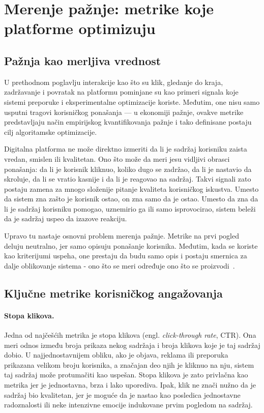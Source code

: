 \section{Merenje pažnje: metrike koje platforme optimizuju}

\subsection{Pažnja kao merljiva vrednost}

U prethodnom poglavlju interakcije kao što su klik, gledanje do kraja, zadržavanje i povratak na platformu pominjane su kao primeri signala koje sistemi preporuke i eksperimentalne optimizacije koriste. Međutim, one nisu samo usputni tragovi korisničkog ponašanja — u ekonomiji pažnje, ovakve metrike predstavljaju način empirijskog kvantifikovanja pažnje i tako definisane postaju cilj algoritamske optimizacije.

Digitalna platforma ne može direktno izmeriti da li je sadržaj korisniku zaista vredan, smislen ili kvalitetan. Ono što može da meri jesu vidljivi obrasci ponašanja: da li je korisnik kliknuo, koliko dugo se zadržao, da li je nastavio da skroluje, da li se vratio kasnije i da li je reagovao na sadržaj. Takvi signali zato postaju zamena za mnogo složenije pitanje kvaliteta korisničkog iskustva. Umesto da sistem zna zašto je korisnik ostao, on zna samo da je ostao. Umesto da zna da li je sadržaj korisniku pomogao, uznemirio ga ili samo isprovocirao, sistem beleži da je sadržaj uspeo da izazove reakciju.

Upravo tu nastaje osnovni problem merenja pažnje. Metrike na prvi pogled deluju neutralno, jer samo opisuju ponašanje korisnika. Međutim, kada se koriste kao kriterijumi uspeha, one prestaju da budu samo opis i postaju smernica za dalje oblikovanje sistema - ono što se meri određuje ono što se proizvodi~\cite{wu2017returning}.

\subsection{Ključne metrike korisničkog angažovanja}

\paragraph{Stopa klikova.}
Jedna od najčešćih metrika je stopa klikova (engl. \textit{click-through rate}, CTR). Ona meri odnos između broja prikaza nekog sadržaja i broja klikova koje je taj sadržaj dobio. U najjednostavnijem obliku, ako je objava, reklama ili preporuka prikazana velikom broju korisnika, a značajan deo njih je kliknuo na nju, sistem taj sadržaj može protumačiti kao uspešan. Stopa klikova je zato privlačna kao metrika jer je jednostavna, brza i lako uporediva. Ipak, klik ne znači nužno da je sadržaj bio kvalitetan, jer je moguće da je nastao kao posledica jednostavne radoznalosti ili neke intenzivne emocije indukovane prvim pogledom na sadržaj.

